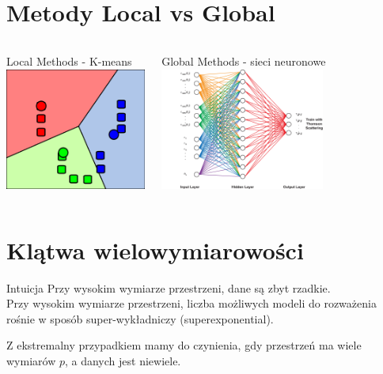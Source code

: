 \documentclass[a4paper]{beamer}
\begin{document}
\section{Metody Local vs Global}
\begin{frame}
\begin{columns}
\begin{block}{Local Methods}
- K-means \\[0.2cm]
\includegraphics[height=4cm]{kmeans.png}
\end{block}
\begin{block}{Global Methods}
- sieci neuronowe \\[0.2cm]
\includegraphics[height=4cm]{neuralnetwork.png}
\end{block}
\end{columns}
\end{frame}

\section{Klątwa wielowymiarowości}
\begin{frame}
\pause
\begin{block}{Intuicja}
Przy wysokim wymiarze przestrzeni, dane są zbyt rzadkie. \\
Przy wysokim wymiarze przestrzeni, liczba możliwych modeli do rozważenia rośnie w sposób super-wykładniczy (superexponential).

\end{block}
Z ekstremalny przypadkiem mamy do czynienia, gdy przestrzeń ma wiele wymiarów $p$, a danych jest niewiele.
\end{frame}
\end{document}
